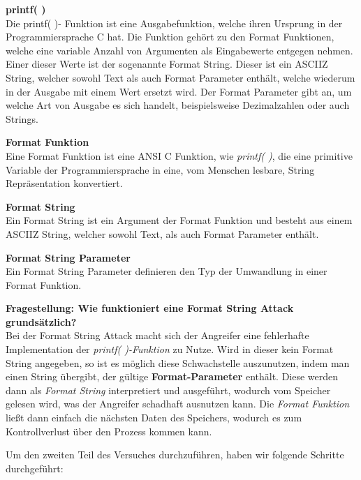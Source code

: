 \documentclass[12pt,a4paper]{article}
\begin{document}
	\textbf{printf( )} \\
	Die printf( )- Funktion ist eine Ausgabefunktion, welche ihren Ursprung in der Programmiersprache C hat. Die Funktion gehört zu den Format Funktionen, welche  eine variable Anzahl von Argumenten als Eingabewerte entgegen nehmen. Einer dieser Werte ist der sogenannte Format String. Dieser ist ein ASCIIZ String, welcher sowohl Text als auch Format Parameter enthält, welche wiederum in der Ausgabe mit einem Wert ersetzt wird. Der Format Parameter gibt an, um welche Art von Ausgabe es sich handelt, beispielsweise Dezimalzahlen oder auch Strings.
	\bigskip
	
	\textbf{Format Funktion} \\
	Eine Format Funktion ist eine ANSI C Funktion, wie \textit{printf( )}, die eine primitive Variable der Programmiersprache in eine, vom Menschen lesbare, String Repräsentation konvertiert.
	\bigskip
	
	\textbf{Format String} \\
	Ein Format String ist ein Argument der Format Funktion und besteht aus einem ASCIIZ String, welcher sowohl Text, als auch Format Parameter enthält.
	\bigskip
	
	\textbf{Format String Parameter} \\
	Ein Format String Parameter definieren den Typ der Umwandlung in einer Format Funktion.
	\bigskip
	
	\textbf{Fragestellung: Wie funktioniert eine Format String Attack grundsätzlich?} \\
	Bei der Format String Attack macht sich der Angreifer eine fehlerhafte Implementation der \textit{printf( )-Funktion} zu Nutze. Wird in dieser kein Format String angegeben, so ist es möglich diese Schwachstelle auszunutzen, indem man einen String übergibt, der gültige \textbf{Format-Parameter} enthält. Diese werden dann als \textit{Format String} interpretiert und ausgeführt, wodurch vom Speicher gelesen wird, was der Angreifer schadhaft ausnutzen kann. Die \textit{Format Funktion} ließt dann einfach die nächsten Daten des Speichers, wodurch es zum Kontrollverlust über den Prozess kommen kann.
	\bigskip
	
	Um den zweiten Teil des Versuches durchzuführen, haben wir folgende Schritte durchgeführt:
	
\end{document}
